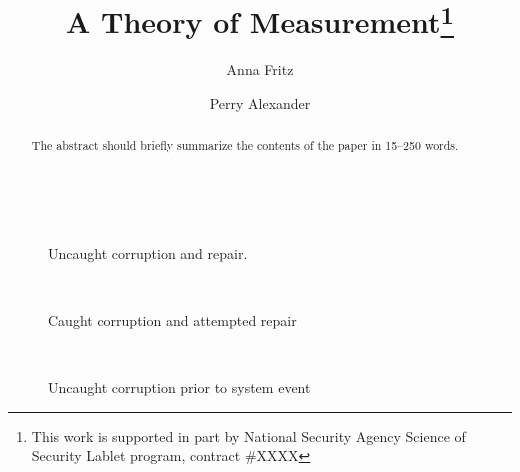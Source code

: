 \documentclass[Runningheads]{llncs}
\begin{document}
%
\title{A Theory of Measurement\thanks{This work is supported in part by
    National Security Agency Science of Security Lablet program,
    contract \#XXXX}} 
%
%
\author{Anna Fritz \and Perry Alexander}
%
%
%
\maketitle              %
%
\begin{abstract}
The abstract should briefly summarize the contents of the paper in
15--250 words.

\end{abstract}
%
%
%

\begin{figure}[hbtp]
  \centering
  ~
  \caption{Uncaught corruption and repair.}
\end{figure}

\begin{figure}[hbtp]
  \centering
  ~
  \caption{Caught corruption and attempted repair}
\end{figure}

\begin{figure}[hbtp]
  \centering
  ~
  \caption{Uncaught corruption prior to system event}
\end{figure}
\end{document}
